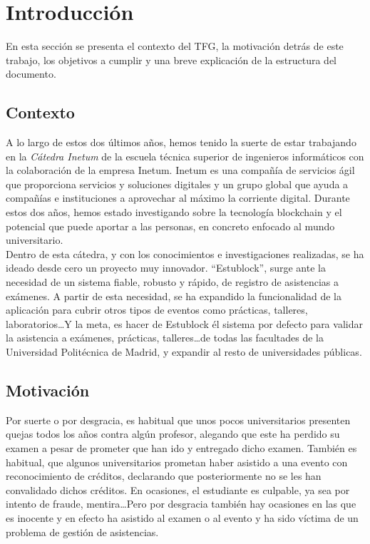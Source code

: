 \chapter{Introducción}
\label{cap:Introduccion}

En esta sección se presenta el contexto del TFG, la motivación detrás de este trabajo, los objetivos a cumplir y una breve explicación de la estructura del documento.

\section{Contexto}

A lo largo de estos dos últimos años, hemos tenido la suerte de estar trabajando en la \emph{Cátedra Inetum} de la escuela técnica superior de ingenieros informáticos con la colaboración de la empresa Inetum. Inetum es una compañía de servicios ágil que proporciona servicios y soluciones digitales y un grupo global que ayuda a compañías e instituciones a aprovechar al máximo la corriente digital. Durante estos dos años, hemos estado investigando sobre la tecnología blockchain y el potencial que puede aportar a las personas, en concreto enfocado al mundo universitario. \\

Dentro de esta cátedra, y con los conocimientos e investigaciones realizadas, se ha ideado desde cero un proyecto muy innovador. ``Estublock'', surge ante la necesidad de un sistema fiable, robusto y rápido, de registro de asistencias a exámenes. A partir de esta necesidad, se ha expandido la funcionalidad de la aplicación para cubrir otros tipos de eventos como prácticas, talleres, laboratorios\dots Y la meta, es hacer de Estublock él sistema por defecto para validar la asistencia a exámenes, prácticas, talleres\dots de todas las facultades de la Universidad Politécnica de Madrid, y expandir al resto de universidades públicas. 

\section{Motivación}

  Por suerte o por desgracia, es habitual que unos pocos universitarios presenten quejas todos los años contra algún profesor, alegando que este ha perdido su examen a pesar de prometer que han ido y entregado dicho examen. También es habitual, que algunos universitarios prometan haber asistido a una evento con reconocimiento de créditos, declarando que posteriormente no se les han convalidado dichos créditos. En ocasiones, el estudiante es culpable, ya sea por intento de fraude, mentira\dots Pero por desgracia también hay ocasiones en las que es inocente y en efecto ha asistido al examen o al evento y ha sido víctima de un problema de gestión de asistencias. \\

